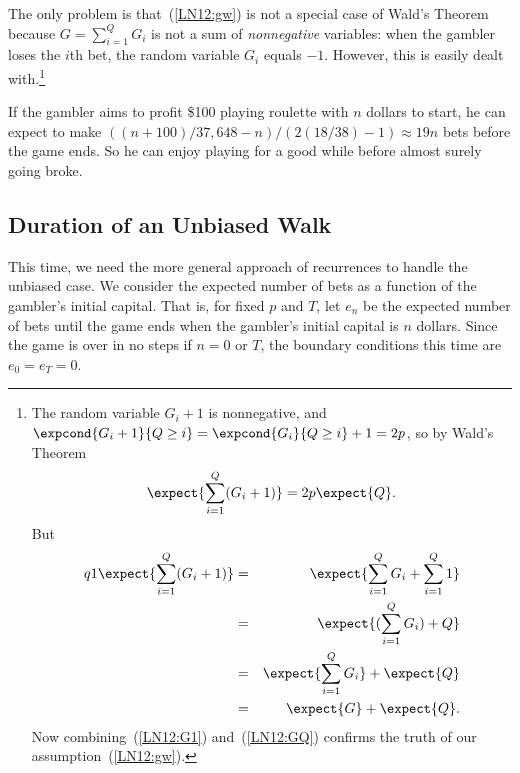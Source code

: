 \begin{editingnotes}
The only problem is that~(\ref{LN12:gw}) is not a special case of Wald's
Theorem because $G = \sum_{i=1}^Q G_i$ is not a sum of \emph{nonnegative}
variables: when the gambler loses the $i$th bet, the random variable $G_i$
equals $-1$.  However, this is easily dealt with.\footnote{The random variable
$G_i+1$ is nonnegative, and $\expcond{G_i+1}{Q \geq i} =
\expcond{G_i}{Q\geq i}+1 = 2p$, so by Wald's Theorem
\begin{equation}\label{LN12:G1}
\expect{\sum_{i=1}^Q (G_i+1)}  = 2p\expect{Q}.
\end{equation}
But
\begin{eqnarray}q1
\expect{\sum_{i=1}^Q (G_i+1)} & = & \expect{\sum_{i=1}^Q G_i + \sum_{i=1}^Q 1}\notag\\
   & = & \expect{(\sum_{i=1}^Q G_i) + Q}\notag\\
   & = & \expect{\sum_{i=1}^Q G_i} + \expect{Q}\notag\\
   & = & \expect{G} + \expect{Q}\label{LN12:GQ}.
\end{eqnarray}
Now combining~(\ref{LN12:G1}) and~(\ref{LN12:GQ}) confirms the truth of our
assumption~(\ref{LN12:gw}).}

\begin{example}
If the gambler aims to profit \$100 playing roulette with $n$ dollars to
start, he can expect to make $((n+100)/37,648 - n)/(2(18/38) - 1) \approx
19n$ bets before the game ends.  So he can enjoy playing for a good while
before almost surely going broke.
\end{example}


\subsection{Duration of an Unbiased Walk}

This time, we need the more general approach of recurrences to handle the
unbiased case.  We consider the expected number of bets as a
function of the gambler's initial capital.  That is, for fixed $p$ and $T$,
let $e_n$ be the expected number of bets until the game ends when the
gambler's initial capital is $n$ dollars.  Since the game is over in no
steps if $n=0$ or $T$, the boundary conditions this time are $e_0=e_T=0$.


\end{editingnotes}
